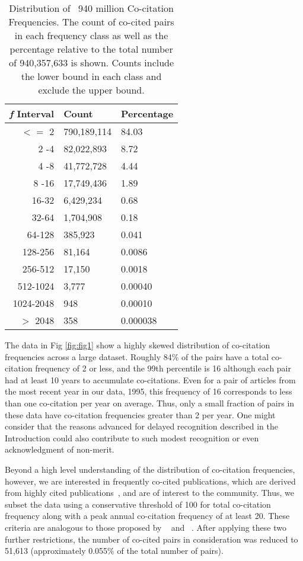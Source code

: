 \documentclass[utf8]{frontiersSCNS}
\newcommand\Tstrut{\rule{0pt}{2.9ex}} %
\begin{document}
\begin{table}[ht]
\caption{Distribution of ~940 million Co-citation Frequencies. The count of co-cited pairs in each frequency class as well as the percentage relative to the total number of 940,357,633 is shown. Counts include the lower bound in each class and exclude the upper bound.}%
\centering %
\begin{center}
\begin{tabular}{rll} 
\emph{f} Interval & Count & Percentage \\
\hline %
$<=$ 2 & 790,189,114 & 84.03 \Tstrut\\ 
2 -4 & 82,022,893 & 8.72 \\
4 -8 & 41,772,728 & 4.44 \\
8 -16 & 17,749,436 & 1.89 \\
16-32 & 6,429,234 & 0.68\\
32-64 & 1,704,908 & 0.18\\
64-128 & 385,923 & 0.041\\
128-256 & 81,164 & 0.0086\\ 
256-512 & 17,150 & 0.0018\\
512-1024 & 3,777 & 0.00040\\
1024-2048 & 948 & 0.00010\\ 
$> $ 2048 & 358 & 0.000038\\   
\hline 
\end{tabular}
\end{center}
\label{tab:table1} %
\end{table}


The data in Fig \ref{fig:fig1} show a highly skewed distribution of co-citation frequencies across a large dataset. Roughly 84\% of the pairs have a total co-citation frequency of 2 or less, and the 99th percentile is 16 although each pair had at least 10 years to accumulate co-citations. Even for a pair of articles from the most recent year in our data, 1995, this frequency of 16 corresponds to less than one co-citation per year on average. Thus, only a small fraction of pairs in these data have co-citation frequencies greater than 2 per year. One might consider that the reasons advanced for delayed recognition described in the Introduction could also contribute to such modest recognition or even acknowledgment of non-merit.

Beyond a high level understanding of the distribution of co-citation frequencies, however, we are interested in frequently co-cited publications, which are derived from highly cited publications~\citep{Small1973}, and 
are of interest to the community.  Thus, we subset the data using a conservative threshold of 100 for total co-citation frequency along with a peak annual co-citation frequency of at least 20. These criteria are analogous to those proposed by ~\cite{Raan2004} and ~\cite{redner_2005}. After applying these two further restrictions, the number of co-cited pairs in consideration was reduced to 51,613 (approximately 0.055\% of the total number of pairs).
\end{document}
